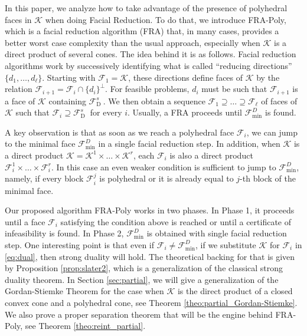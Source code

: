 \documentclass{article}
\newcommand{\feasS}{\mathcal{F}_{\text{D }}^s}
\newcommand{\minFaceD}{ {\mathcal{F}_{\min}^D}}
\newcommand{\stdCone}{ {\mathcal{K}}}
\newcommand{\stdFace}{ \mathcal{F}}
\begin{document}
In this paper, we analyze how to take advantage of the presence of polyhedral faces in 
$\stdCone$ when doing Facial Reduction. To do that, 
we introduce  FRA-Poly, which is a facial reduction algorithm (FRA) that, in many cases, provides a better worst case complexity than 
the usual approach, especially when $\stdCone$ is a direct product of several 
cones. The idea behind it is as follows. 
Facial reduction algorithms work by successively identifying what is called ``reducing 
directions'' $\{d_1, \ldots, d_\ell \}$. Starting with $\stdFace _1 = \stdCone$, these 
directions define faces of $\stdCone$ by the relation $\stdFace _{i+1} = \stdFace _{i} \cap \{d_i\}^\perp$. For feasible problems, $d_i$ must be 
such that  $\stdFace _{i+1}$ is a face of $\stdCone$ containing $\feasS$.
We then obtain a sequence  $\stdFace _1 \supseteq \ldots \supseteq \stdFace _\ell$ of faces of 
$\stdCone$ such that $\stdFace _i \supseteq \feasS$ for every $i$. Usually, a FRA proceeds 
until  $\minFaceD$ is found.

A key observation is that as soon as we reach a polyhedral face $\stdFace _i$, we can 
jump to the minimal face $\minFaceD$ in a single facial reduction step. 
In addition, when $\stdCone$ is a direct product $\stdCone = \stdCone^1 \times \ldots \times \stdCone^r$, 
each $\stdFace _i$ is also a direct product  $\stdFace_i^1 \times \ldots \times \stdFace_i^r$.
In this case an even weaker condition is sufficient to jump to $\minFaceD$, namely, 
if every block $\stdFace _i ^j$ is polyhedral or 
it is already equal to $j$-th block of the minimal face. 


Our proposed algorithm FRA-Poly works in two phases. In Phase 1, it proceeds until a face 
$\stdFace _i$ satisfying  the  condition above is reached or until a certificate of 
infeasibility is found. In Phase 2, $\minFaceD$ 
is obtained with single facial reduction step. 
One  interesting point is 
that even if $\stdFace _i \neq \minFaceD$, if we substitute 
$\stdCone$ for $\stdFace _i$ in \eqref{eq:dual}, then strong 
duality will hold. The theoretical backing for that is given by Proposition \ref{prop:slater2}, which 
is a generalization of the classical strong duality theorem. In Section \ref{sec:partial}, 
we will give a generalization of the Gordan-Stiemke 
Theorem for the case when $\stdCone$ is the direct product of a closed convex cone and a polyhedral cone, see 
Theorem \ref{theo:partial_Gordan-Stiemke}. We also prove a proper separation theorem that will be 
the engine behind FRA-Poly, see Theorem \ref{theo:reint_partial}.
\end{document}
